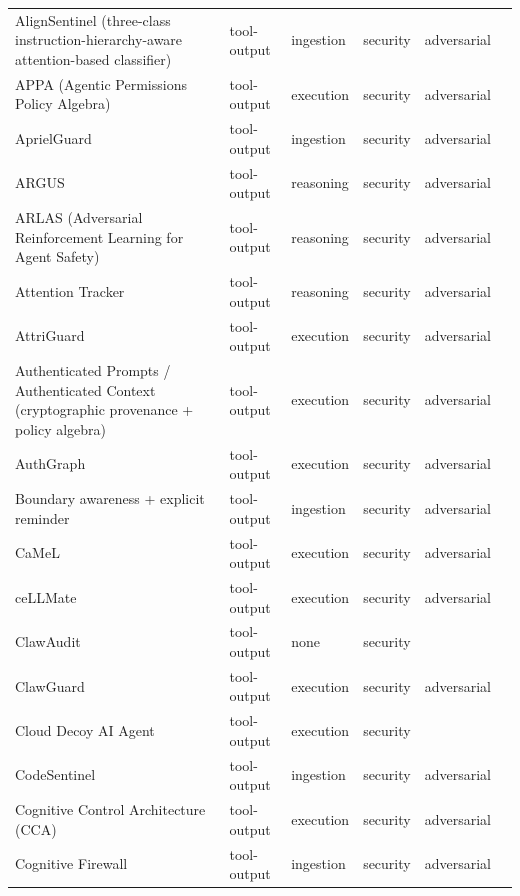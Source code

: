 \begin{longtable}{@{}>{\raggedright\arraybackslash}p{}lllll@{}}
AlignSentinel (three-class instruction-hierarchy-aware attention-based classifier) & tool-output & ingestion & security & adversarial & \cite{jia-2026-alignsentinel} \\
APPA (Agentic Permissions Policy Algebra) & tool-output & execution & security & adversarial & \cite{kravchenko-2026-agentic} \\
AprielGuard & tool-output & ingestion & security & adversarial & \cite{kasundra-2025-aprielguard} \\
ARGUS & tool-output & reasoning & security & adversarial & \cite{weng-2026-argus} \\
ARLAS (Adversarial Reinforcement Learning for Agent Safety) & tool-output & reasoning & security & adversarial & \cite{wang-2025-adversarial} \\
Attention Tracker & tool-output & reasoning & security & adversarial & \cite{hung-2024-attention} \\
AttriGuard & tool-output & execution & security & adversarial & \cite{he-2026-attriguard} \\
Authenticated Prompts / Authenticated Context (cryptographic provenance + policy algebra) & tool-output & execution & security & adversarial & \cite{rajagopalan-2026-protecting} \\
AuthGraph & tool-output & execution & security & adversarial & \cite{wang-2026-aligning} \\
Boundary awareness + explicit reminder & tool-output & ingestion & security & adversarial & \cite{yi-2023-benchmarking} \\
CaMeL & tool-output & execution & security & adversarial & \cite{debenedetti-2025-defeating} \\
ceLLMate & tool-output & execution & security & adversarial & \cite{meng-2025-cellmate} \\
ClawAudit & tool-output & none & security &  & \cite{zhang-2026-local} \\
ClawGuard & tool-output & execution & security & adversarial & \cite{zhao-2026-clawguard} \\
Cloud Decoy AI Agent & tool-output & execution & security &  & \cite{manivannan-2026-agentic} \\
CodeSentinel & tool-output & ingestion & security & adversarial & \cite{cheng-2026-codesentinel} \\
Cognitive Control Architecture (CCA) & tool-output & execution & security & adversarial & \cite{liang-2025-cognitive} \\
Cognitive Firewall & tool-output & ingestion & security & adversarial & \cite{lan-2026-cognitive} \\

\end{longtable}
